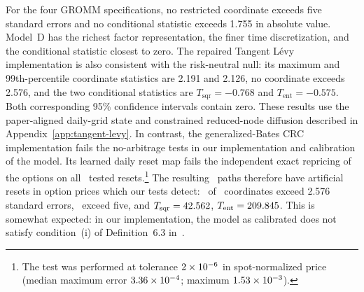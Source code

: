 \documentclass[11pt]{article}
\theoremstyle{plain}
\theoremstyle{definition}
\theoremstyle{remark}
\begin{document}
For the four GROMM specifications, no restricted coordinate exceeds five
standard errors and no conditional statistic exceeds 1.755 in absolute value.
Model~D has the richest factor representation, the finer time discretization,
and the conditional statistic closest to zero.  The repaired Tangent L\'evy
implementation is also consistent with the risk-neutral null: its maximum and
99th-percentile coordinate statistics are 2.191 and 2.126, no coordinate
exceeds 2.576, and the two conditional statistics are
$T_{\mathrm{sqr}}=-0.768$ and $T_{\mathrm{ent}}=-0.575$.  Both corresponding
95\% confidence intervals contain zero.  These results use the paper-aligned
daily-grid state and constrained reduced-node diffusion described in
Appendix~\ref{app:tangent-levy}.
In contrast, the generalized-Bates CRC implementation fails the no-arbitrage tests
in our implementation and calibration of the model.
Its learned daily reset map fails the independent exact
repricing of the options on all \CrcResetGateSamples\ tested resets.\footnote{The test was performed at tolerance
  $2\times10^{-6}$ in spot-normalized price (median maximum error
$3.36\times10^{-4}$; maximum $1.53\times10^{-3}$).}  The resulting
\CrcQPathCount\ paths
therefore have artificial resets in option prices which our tests detect:
\CrcQAboveTwoFiveSevenSix\ of \CrcQCoordinates\ coordinates exceed 2.576 standard
errors, \CrcQAboveFive\ exceed five, and $T_{\mathrm{sqr}}=42.562$,
$T_{\mathrm{ent}}=209.845$.  This is somewhat expected: in our implementation, the model as calibrated does not satisfy
condition~(i) of Definition~6.3 in~\cite{DysLitGambaraTeichmann2021}.
\end{document}
